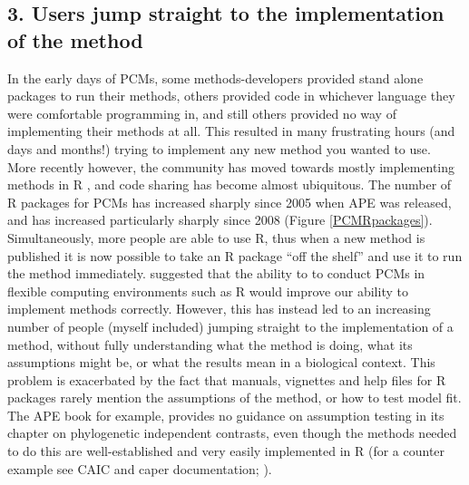 \documentclass[a4paper,12pt]{article}
\begin{document}
  \subsection{3. Users jump straight to the implementation of the method}
    In the early days of PCMs, some methods-developers provided stand alone packages to run their methods, others provided code in whichever language they were comfortable programming in, and still others provided no way of implementing their methods at all. 
    This resulted in many frustrating hours (and days and months!) trying to implement any new method you wanted to use.\\

    More recently however, the community has moved towards mostly implementing methods in R \citep{R-Core-Team:2014aa}, and code sharing has become almost ubiquitous. 
    The number of R packages for PCMs has increased sharply since 2005 when APE \citep{Paradis:2004aa} was released, and has increased particularly sharply since 2008 (Figure \ref{PCMRpackages}).
    Simultaneously, more people are able to use R, thus when a new method is published it is now possible to take an R package ``off the shelf'' and use it to run the method immediately.
    \citet{freckleton2009seven} suggested that the ability to to conduct PCMs in flexible computing environments such as R would improve our ability to implement methods correctly. 
    However, this has instead led to an increasing number of people (myself included) jumping straight to the implementation of a method, without fully understanding what the method is doing, what its assumptions might be, or what the results mean in a biological context.
    This problem is exacerbated by the fact that manuals, vignettes and help files for R packages rarely mention the assumptions of the method, or how to test model fit. 
    The APE book \citep{paradis2011analysis} for example, provides no guidance on assumption testing in its chapter on phylogenetic independent contrasts, even though the methods needed to do this are well-established and very easily implemented in R (for a counter example see CAIC and caper documentation; \citealp{purvis1995comparative,Orme:2013aa}).\\
    
\end{document}

